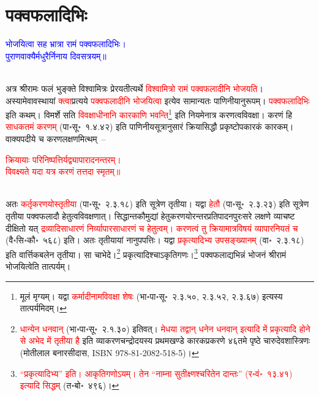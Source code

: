 \section[पक्वफलादिभिः]{पक्वफलादिभिः}
\centering\textcolor{blue}{भोजयित्वा सह भ्रात्रा रामं पक्वफलादिभिः।\nopagebreak\\
पुराणवाक्यैर्मधुरैर्निनाय दिवसत्रयम्॥}\nopagebreak\\
\\
\begin{sloppypar}\justifying\noindent\hspace{10mm} अत्र श्रीरामः फलं भुङ्क्ते विश्वामित्रः प्रेरयतीत्यर्थे \textcolor{red}{विश्वामित्रो रामं पक्व\-फलादीनि भोजयति}। अस्यामेवावस्थायां \textcolor{red}{क्त्वा}\-प्रत्यये \textcolor{red}{पक्वफलादीनि भोजयित्वा} इत्येव सामान्यतः पाणिनीयानुरूपम्। \textcolor{red}{पक्व\-फलादिभिः} इति कथम्। विमर्शे सति \textcolor{red}{विवक्षाधीनानि कारकाणि भवन्ति}\footnote{मूलं मृग्यम्। यद्वा \textcolor{red}{कर्मादीनामविवक्षा शेषः} (भा॰पा॰सू॰~२.३.५०, २.३.५२, २.३.६७) इत्यस्य तात्पर्यमिदम्।} इति नियमेनात्र करणत्व\-विवक्षा। करणं हि \textcolor{red}{साधकतमं करणम्‌} (पा॰सू॰~१.४.४२) इति पाणिनीय\-सूत्रानुसारं क्रिया\-सिद्धौ प्रकृष्टोप\-कारकं कारकम्। वाक्य\-पदीये च करण\-लक्षणमित्थम्~–\end{sloppypar}
\centering\textcolor{red}{क्रियायाः परिनिष्पत्तिर्यद्व्यापारादनन्तरम्।\nopagebreak\\
विवक्ष्यते यदा यत्र करणं तत्तदा स्मृतम्॥}\nopagebreak\\
\\
\begin{sloppypar}\justifying\noindent अतः \textcolor{red}{कर्तृ\-करणयोस्तृतीया} (पा॰सू॰~२.३.१८) इति सूत्रेण तृतीया। यद्वा \textcolor{red}{हेतौ} (पा॰सू॰~२.३.२३) इति सूत्रेण तृतीया पक्व\-फलादौ हेतुत्व\-विवक्षणात्। सिद्धान्त\-कौमुद्यां हेतु\-करणयोरन्तर\-प्रतिपादन\-पुरः\-सरे लक्षणे व्याचष्ट दीक्षितो यत् \textcolor{red}{द्रव्यादि\-साधारणं निर्व्यापार\-साधारणं च हेतुत्वम्। करणत्वं तु क्रियामात्र\-विषयं व्यापारनियतं च} (वै॰सि॰कौ॰~५६८) इति। अतः तृतीयायां नानुपपत्तिः। यद्वा \textcolor{red}{प्रकृत्यादिभ्य उपसङ्ख्यानम्‌} (वा॰~२.३.१८) इति वार्त्तिक\-बलेन तृतीया। सा चाभेदे।\footnote{\textcolor{red}{धान्येन धनवान्‌} (भा॰पा॰सू॰~२.१.३०) इतिवत्। \textcolor{red}{मेधया तद्वान् धनेन धनवान् इत्यादि में प्रकृत्यादि होने से अभेद में तृतीया है} इति व्याकरण\-चन्द्रोदयस्य प्रथम\-खण्डे कारक\-प्रकरणे ४६तमे पृष्ठे चारुदेव\-शास्त्रिणः (मोतीलाल बनारसीदास, {\englishfont ISBN 978-81-2082-518-5})।} प्रकृत्यादिश्चाऽकृति\-गणः।\footnote{\textcolor{red}{“प्रकृत्यादिभ्य” इति। आकृतिगणोऽयम्। तेन “नाम्ना सुतीक्ष्णश्चरितेन दान्तः” (र॰वं॰~१३.४१) इत्यादि सिद्धम्‌} (त॰बो॰~४९६)।} पक्व\-फलाद्यभिन्नं भोजनं श्रीरामं भोजयित्वेति तात्पर्यम्।\end{sloppypar}
